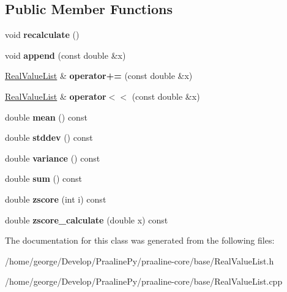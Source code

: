 \subsection*{Public Member Functions}
\begin{DoxyCompactItemize}
\item 
\mbox{\label{class_real_value_list_a06a95924cace38f82f0142d61c6ade12}} 
void {\bfseries recalculate} ()
\item 
\mbox{\label{class_real_value_list_a9181d87538085d4d10295b75a140ec60}} 
void {\bfseries append} (const double \&x)
\item 
\mbox{\label{class_real_value_list_af88af3aa34221d1bf40b6c5311ef7993}} 
\hyperlink{class_real_value_list}{Real\+Value\+List} \& {\bfseries operator+=} (const double \&x)
\item 
\mbox{\label{class_real_value_list_ad6c9dd337d3fcb798d7906eb7c436cae}} 
\hyperlink{class_real_value_list}{Real\+Value\+List} \& {\bfseries operator$<$$<$} (const double \&x)
\item 
\mbox{\label{class_real_value_list_ad02a3650851e83bcffad7ec4d1f6e8d6}} 
double {\bfseries mean} () const
\item 
\mbox{\label{class_real_value_list_ac122cb5e4edd3f69c64636c1cd9625b1}} 
double {\bfseries stddev} () const
\item 
\mbox{\label{class_real_value_list_a96d877a641c329b70ec9fd4f567e0541}} 
double {\bfseries variance} () const
\item 
\mbox{\label{class_real_value_list_a4f843c21973c22fd21a28827e0a69334}} 
double {\bfseries sum} () const
\item 
\mbox{\label{class_real_value_list_a2cf2532da5995a9a72b1a090710aad2b}} 
double {\bfseries zscore} (int i) const
\item 
\mbox{\label{class_real_value_list_a0b07bac4cb0debc3bdd00cb57c25feeb}} 
double {\bfseries zscore\+\_\+calculate} (double x) const
\end{DoxyCompactItemize}


The documentation for this class was generated from the following files\+:\begin{DoxyCompactItemize}
\item 
/home/george/\+Develop/\+Praaline\+Py/praaline-\/core/base/Real\+Value\+List.\+h\item 
/home/george/\+Develop/\+Praaline\+Py/praaline-\/core/base/Real\+Value\+List.\+cpp\end{DoxyCompactItemize}
